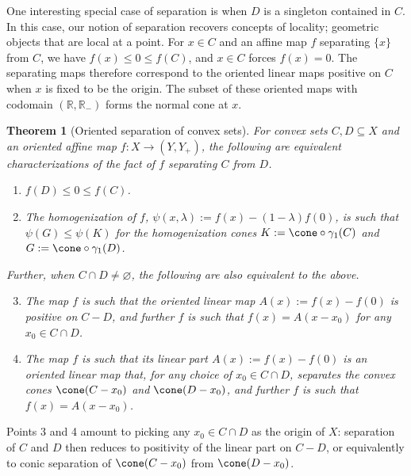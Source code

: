 \documentclass{article}
\theoremstyle{plain}
\newtheorem{theorem}{Theorem}[section]
\theoremstyle{definition}
\theoremstyle{remark}
\begin{document}
One interesting special case of separation is when $D$ is a singleton contained in $C$.
In this case, our notion of separation recovers concepts of locality; geometric objects
that are local at a point.
For $x \in C$ and an affine map $f$ separating $\{x\}$ from $C$, we have $f(x) \leq 0 \leq f(C)$, and $x \in C$ forces $f(x)=0$. 
The separating maps therefore correspond to the oriented linear maps positive on $C$ when $x$ is fixed to be the origin. 
The subset of these oriented maps with codomain
$(\mathbb{R}, \mathbb{R}_{-})$ forms the normal
cone at $x$.
\begin{theorem}[Oriented separation of convex sets]
\label{loc:oriented_separation_of_convex_sets.statement}
For convex sets $C, D \subseteq X$ and an oriented affine map $f:X \to (Y, Y_+)$,
the following are equivalent characterizations of the fact of $f$ separating $C$ from $D$.
\begin{enumerate}
\item $f(D) \le 0 \le f(C)$.
\item The homogenization of $f$, $\psi(x, \lambda) := f(x) - (1-\lambda) f(0)$, is such that $\psi(G) \le \psi(K)$ for the homogenization cones $K := \cone \circ \gamma_1(C)$ and $G := \cone\circ\gamma_1(D)$.
\end{enumerate}

Further, when $C \cap D \neq \varnothing$, the following are also equivalent to the above.
\begin{enumerate}
\setcounter{enumi}{2}
\item The map $f$ is such that the oriented linear map $A(x) := f(x) - f(0)$ is positive on $C-D$, and further $f$ is such that $f(x) = A(x-x_0)$ for any $x_0 \in C \cap D$.
\item The map $f$ is such that its linear part $A(x) := f(x)-f(0)$ is an oriented linear map that, for any choice of $x_0 \in C \cap D$, separates the convex cones $\cone(C - x_0)$ and $\cone(D- x_0)$, and further $f$ is such that $f(x) = A(x-x_0)$.
\end{enumerate}
\end{theorem}
Points 3 and 4 amount to picking any $x_0 \in C \cap D$ as the origin of $X$:
separation of $C$ and $D$ then reduces to positivity of the linear part on $C-D$,
or equivalently to conic separation of $\cone(C - x_0)$ from $\cone(D-x_0)$.
\end{document}
